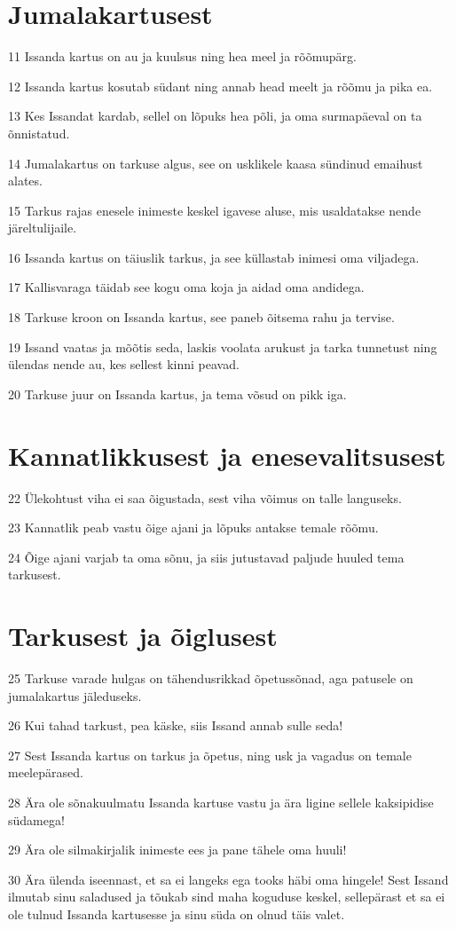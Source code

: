 \section*{Jumalakartusest}

\par 11 Issanda kartus on au ja kuulsus ning hea meel ja rõõmupärg.
\par 12 Issanda kartus kosutab südant ning annab head meelt ja rõõmu ja pika ea.
\par 13 Kes Issandat kardab, sellel on lõpuks hea põli, ja oma surmapäeval on ta õnnistatud.
\par 14 Jumalakartus on tarkuse algus, see on usklikele kaasa sündinud emaihust alates.
\par 15 Tarkus rajas enesele inimeste keskel igavese aluse, mis usaldatakse nende järeltulijaile.
\par 16 Issanda kartus on täiuslik tarkus, ja see küllastab inimesi oma viljadega.
\par 17 Kallisvaraga täidab see kogu oma koja ja aidad oma andidega.
\par 18 Tarkuse kroon on Issanda kartus, see paneb õitsema rahu ja tervise.
\par 19 Issand vaatas ja mõõtis seda, laskis voolata arukust ja tarka tunnetust ning ülendas nende au, kes sellest kinni peavad.
\par 20 Tarkuse juur on Issanda kartus, ja tema võsud on pikk iga.
\section*{Kannatlikkusest ja enesevalitsusest}

\par 22 Ülekohtust viha ei saa õigustada, sest viha võimus on talle languseks.
\par 23 Kannatlik peab vastu õige ajani ja lõpuks antakse temale rõõmu.
\par 24 Õige ajani varjab ta oma sõnu, ja siis jutustavad paljude huuled tema tarkusest.

\section*{Tarkusest ja õiglusest}

\par 25 Tarkuse varade hulgas on tähendusrikkad õpetussõnad, aga patusele on jumalakartus jäleduseks.
\par 26 Kui tahad tarkust, pea käske, siis Issand annab sulle seda!
\par 27 Sest Issanda kartus on tarkus ja õpetus, ning usk ja vagadus on temale meelepärased.
\par 28 Ära ole sõnakuulmatu Issanda kartuse vastu ja ära ligine sellele kaksipidise südamega!
\par 29 Ära ole silmakirjalik inimeste ees ja pane tähele oma huuli!
\par 30 Ära ülenda iseennast, et sa ei langeks ega tooks häbi oma hingele! Sest Issand ilmutab sinu saladused ja tõukab sind maha koguduse keskel, sellepärast et sa ei ole tulnud Issanda kartusesse ja sinu süda on olnud täis valet.

